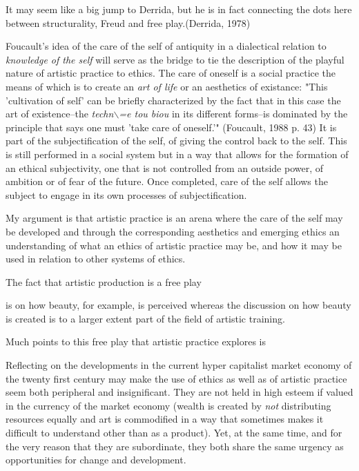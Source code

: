 \documentclass[11pt]{article}
\makeatletter
\newcommand{\citeprocitem}[2]{\hyper@linkstart{cite}{citeproc_bib_item_#1}#2\hyper@linkend}
\makeatother
\begin{document}
It may seem like a big jump to Derrida, but he is in fact connecting the dots here between structurality, Freud and free play.(\citeprocitem{2}{Derrida, 1978})

Foucault's idea of the care of the self of antiquity in a dialectical relation to \emph{knowledge of the self}  will serve as the bridge to tie the description of the playful nature of artistic practice to ethics. The care of oneself is a social practice the means of which is to create an \emph{art of life} or an aesthetics of existance: "This 'cultivation of self' can be briefly characterized by the fact that in this case the art of existence--the \emph{techn$\backslash$=e tou biou} in its different forms--is dominated by the principle that says one must 'take care of oneself.'" (\citeprocitem{3}{Foucault, 1988} p. 43) It is part of the subjectification of the self, of giving the control back to the self. This is still performed in a social system but in a way that allows for the formation of an ethical subjectivity, one that is not controlled from an outside power, of ambition or of fear of the future. Once completed, care of the self allows the subject to engage in its own processes of subjectification.

My argument is that artistic practice is an arena where the care of the self may be developed and through the corresponding aesthetics and emerging ethics an understanding of what an ethics of artistic practice may be, and how it may be used in relation to other systems of ethics.

The fact that artistic production is a free play



is on how beauty, for example, is perceived whereas the discussion on how beauty is created is to a larger extent part of the field of artistic training.

Much points to this free play that artistic practice explores is



Reflecting on the developments in the current hyper capitalist market economy of the twenty first century may make the use of ethics as well as of artistic practice seem both peripheral and insignificant. They are not held in high esteem if valued in the currency of the market economy (wealth is created by \emph{not} distributing resources equally and art is commodified in a way that sometimes makes it difficult to understand other than as a product). Yet, at the same time, and for the very reason that they are subordinate, they both share the same urgency as opportunities for change and development. 
\end{document}
